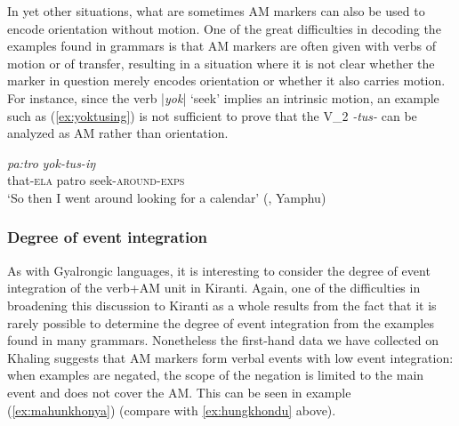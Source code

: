 \documentclass[oneside,a4paper,11pt]{article}
\newcommand{\ipa}[1]{{\phon\textit{#1}}}
\newcommand{\sens}[1]{‘#1’}
\newcommand{\dhatu}[2]{|\ipa{#1}| `#2'}
\begin{document}


In yet other situations, what are sometimes AM markers can also be used to encode orientation without motion.  One of the great difficulties in decoding the examples found in grammars is that AM markers are  often given with verbs of motion or of transfer, resulting in a situation where it is not clear whether the marker in question merely encodes orientation or whether it also carries motion. For instance, since the verb \dhatu{yok}{seek} implies an intrinsic motion, an example such as (\ref{ex:yoktusing}) is not sufficient to prove that the V_2 \ipa{-tus-} can be analyzed as AM rather than orientation.
 
\begin{exe}
\ex \label{ex:yoktusing}
 \gll  \ipa{mo-ba}	\ipa{pa:tro}	\ipa{yok-tus-iŋ} \\
that-\textsc{ela} patro seek-\textsc{around}-\textsc{exps} \\
\glt \sens{So then I went around looking for a calendar} (\citealt[153]{rutgers98yamphu}, Yamphu)
\end{exe}


  
\subsubsection{Degree of event integration} \label{sec:khaling.pluriactionality}

As with Gyalrongic languages, it is interesting to consider the degree of event integration of the verb+AM unit in Kiranti.  Again, one of the difficulties in broadening this discussion to Kiranti as a whole results from the fact that it is rarely possible to determine the degree of event integration from the examples found in many grammars.  Nonetheless the first-hand data we have collected on Khaling suggests that AM markers form verbal events with low event integration: when examples are negated, the scope of the negation is limited to the main event and does not cover the AM. This can be seen in example (\ref{ex:mahunkhonya}) (compare with \ref{ex:hungkhondu} above). 
\end{document}
